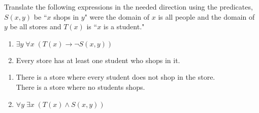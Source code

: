 \documentclass[12pt,addpoints]{exam}
\newcommand{\ra}{\rightarrow}
\begin{document}
\begin{questions}
\question[4] Translate the following expressions in the needed direction using the predicates, $S(x,y)$ be ``$x$ shops in $y$" were the domain of $x$ is all people and the domain of $y$ be all stores and $T(x)$ is ``$x$ is a student."
\begin{enumerate}[label=(\alph*),itemsep=0pt,parsep=0pt,topsep=0pt,partopsep=0pt]
    \item $\exists y\; \forall x\; (T(x) \ra \neg S(x,y))$
    \item Every store has at least one student who shops in it.
\end{enumerate}
    \ifprintanswers
        \vspace{-10pt}
    \fi
\begin{solution}
    \begin{enumerate}[label=(\alph*),itemsep=0pt,parsep=0pt,topsep=0pt,partopsep=0pt]
        \item There is a store where every student does not shop in the store. \\
        There is a store where no students shops.
        \item $\forall y\; \exists x\; (T(x) \wedge S(x,y))$
    \end{enumerate}
\end{solution}



\end{questions}
\end{document}
